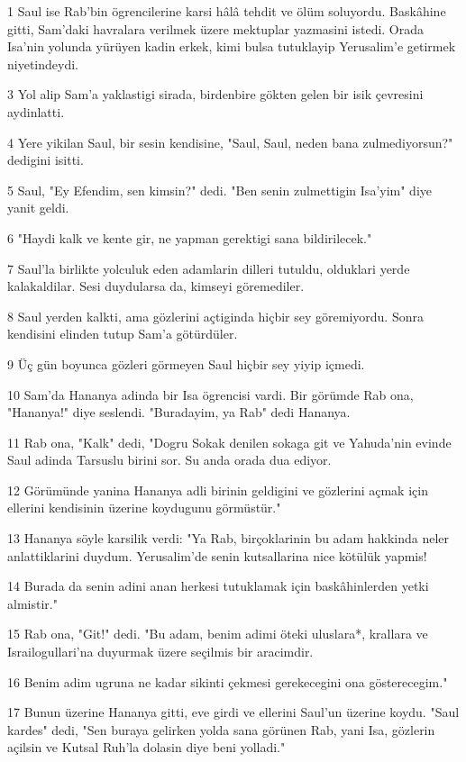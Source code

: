 \par 1 Saul ise Rab'bin ögrencilerine karsi hâlâ tehdit ve ölüm soluyordu. Baskâhine gitti, Sam'daki havralara verilmek üzere mektuplar yazmasini istedi. Orada Isa'nin yolunda yürüyen kadin erkek, kimi bulsa tutuklayip Yerusalim'e getirmek niyetindeydi.
\par 3 Yol alip Sam'a yaklastigi sirada, birdenbire gökten gelen bir isik çevresini aydinlatti.
\par 4 Yere yikilan Saul, bir sesin kendisine, "Saul, Saul, neden bana zulmediyorsun?" dedigini isitti.
\par 5 Saul, "Ey Efendim, sen kimsin?" dedi. "Ben senin zulmettigin Isa'yim" diye yanit geldi.
\par 6 "Haydi kalk ve kente gir, ne yapman gerektigi sana bildirilecek."
\par 7 Saul'la birlikte yolculuk eden adamlarin dilleri tutuldu, olduklari yerde kalakaldilar. Sesi duydularsa da, kimseyi göremediler.
\par 8 Saul yerden kalkti, ama gözlerini açtiginda hiçbir sey göremiyordu. Sonra kendisini elinden tutup Sam'a götürdüler.
\par 9 Üç gün boyunca gözleri görmeyen Saul hiçbir sey yiyip içmedi.
\par 10 Sam'da Hananya adinda bir Isa ögrencisi vardi. Bir görümde Rab ona, "Hananya!" diye seslendi. "Buradayim, ya Rab" dedi Hananya.
\par 11 Rab ona, "Kalk" dedi, "Dogru Sokak denilen sokaga git ve Yahuda'nin evinde Saul adinda Tarsuslu birini sor. Su anda orada dua ediyor.
\par 12 Görümünde yanina Hananya adli birinin geldigini ve gözlerini açmak için ellerini kendisinin üzerine koydugunu görmüstür."
\par 13 Hananya söyle karsilik verdi: "Ya Rab, birçoklarinin bu adam hakkinda neler anlattiklarini duydum. Yerusalim'de senin kutsallarina nice kötülük yapmis!
\par 14 Burada da senin adini anan herkesi tutuklamak için baskâhinlerden yetki almistir."
\par 15 Rab ona, "Git!" dedi. "Bu adam, benim adimi öteki uluslara*, krallara ve Israilogullari'na duyurmak üzere seçilmis bir aracimdir.
\par 16 Benim adim ugruna ne kadar sikinti çekmesi gerekecegini ona gösterecegim."
\par 17 Bunun üzerine Hananya gitti, eve girdi ve ellerini Saul'un üzerine koydu. "Saul kardes" dedi, "Sen buraya gelirken yolda sana görünen Rab, yani Isa, gözlerin açilsin ve Kutsal Ruh'la dolasin diye beni yolladi."
